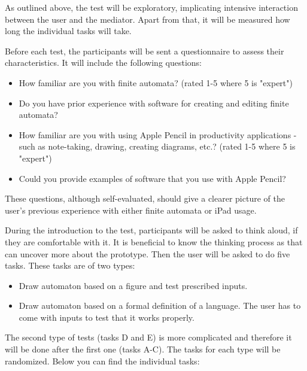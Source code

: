 As outlined above, the test will be exploratory, implicating intensive interaction between the user and the mediator. Apart from that, it will be measured how long the individual tasks will take.

Before each test, the participants will be sent a questionnaire to assess their characteristics. It will include the following questions:
\begin{itemize}
    \item How familiar are you with finite automata? (rated 1-5 where 5 is "expert")
    \item Do you have prior experience with software for creating and editing finite automata?
    \item How familiar are you with using Apple Pencil in productivity applications - such as note-taking, drawing, creating diagrams, etc.? (rated 1-5 where 5 is "expert")
    \item Could you provide examples of software that you use with Apple Pencil?
\end{itemize}
These questions, although self-evaluated, should give a clearer picture of the user's previous experience with either finite automata or iPad usage.

During the introduction to the test, participants will be asked to think aloud, if they are comfortable with it. It is beneficial to know the thinking process as that can uncover more about the prototype. Then the user will be asked to do five tasks. These tasks are of two types:
\begin{itemize}
    \item Draw automaton based on a figure and test prescribed inputs.
    \item Draw automaton based on a formal definition of a language. The user has to come with inputs to test that it works properly.
\end{itemize}

The second type of tests (tasks D and E) is more complicated and therefore it will be done after the first one (tasks A-C). The tasks for each type will be randomized. Below you can find the individual tasks:

